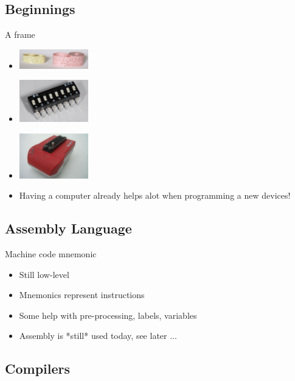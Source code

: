 \documentclass{beamer}
\begin{document}
\subsection[Older]{Beginnings}

\begin{frame}{A frame}
  \begin{itemize}
  \item
    \includegraphics[width=30mm]{../assets/PaperTapes-5and8Hole.eps}
    \cite{PaperTape}
  \item
    \includegraphics[width=30mm]{../assets/DIP_switch_01_Pengo.eps}
    \cite{DIPSwitchImage}    
  \item
    \includegraphics[width=30mm]{../assets/Programmer_conitec_galep5.eps}
    \cite{EPROMProgrammer}   
  \item
    Having a computer already helps alot when programming a new devices!
  \end{itemize}
\end{frame}

\subsection[Assembly]{Assembly Language}

\begin{frame}{Machine code mnemonic}
  \begin{itemize}
  \item
    Still low-level
  \item
    Mnemonics represent instructions
  \item
    Some help with pre-processing, labels, variables
  \item
    Assembly is *still* used today, see later ...
  \end{itemize}
\end{frame}


\subsection[Compilers]{Compilers}
\end{document}
